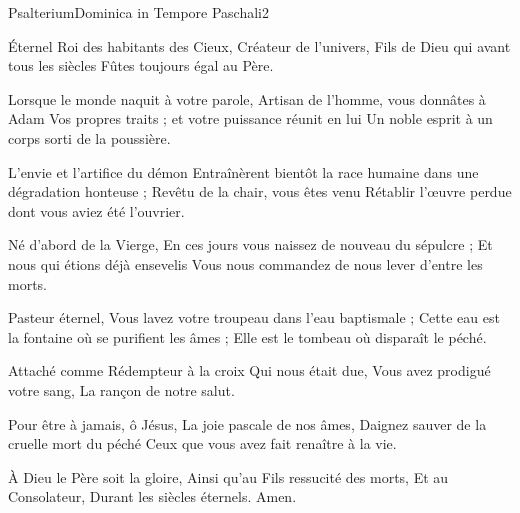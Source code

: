 \documentclass[psautier_nocturne_fr.tex]{subfiles}
\begin{document}
\begin{paracol}
\switchcolumn
\versiculus{}{}
\end{paracol}

	{Psalterium}{Dominica in Tempore Paschali}{2}{}{}{}{}{}{}


Éternel Roi des habitants des Cieux,
Créateur de l'univers,
Fils de Dieu qui avant tous les siècles
Fûtes toujours égal au Père.

Lorsque le monde naquit à votre parole,
Artisan de l'homme, vous donnâtes à Adam
Vos propres traits ; et votre puissance réunit en lui
Un noble esprit à un corps sorti de la poussière.

L'envie et l'artifice du démon
Entraînèrent bientôt la race humaine dans une dégradation honteuse ;
Revêtu de la chair, vous êtes venu
Rétablir l'œuvre perdue dont vous aviez été l'ouvrier.

Né d'abord de la Vierge,
En ces jours vous naissez de nouveau du sépulcre ;
Et nous qui étions déjà ensevelis
Vous nous commandez de nous lever d'entre les morts.

Pasteur éternel,
Vous lavez votre troupeau dans l'eau baptismale ;
Cette eau est la fontaine où se purifient les âmes ;
Elle est le tombeau où disparaît le péché.

Attaché comme Rédempteur à la croix
Qui nous était due,
Vous avez prodigué votre sang,
La rançon de notre salut.

Pour être à jamais, ô Jésus,
La joie pascale de nos âmes,
Daignez sauver de la cruelle mort du péché
Ceux que vous avez fait renaître à la vie.

À Dieu le Père soit la gloire,
Ainsi qu'au Fils ressucité des morts,
Et au Consolateur,
Durant les siècles éternels.
Amen.


\begin{paracol}
\switchcolumn
{}
\end{paracol}
\end{document}
